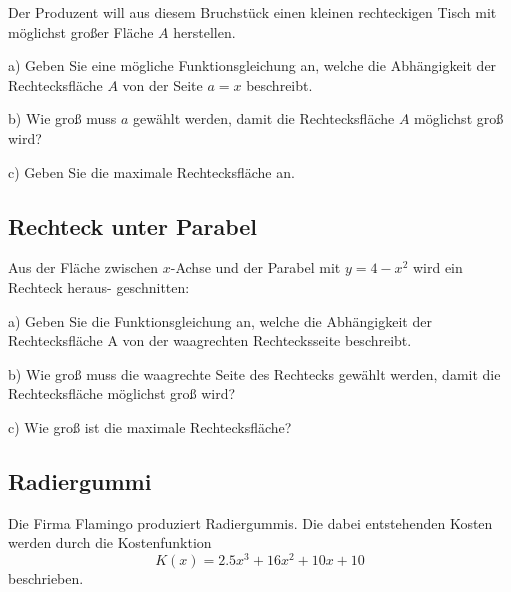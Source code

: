 Der Produzent will aus diesem Bruchstück einen kleinen rechteckigen Tisch mit möglichst großer
Fläche $A$ herstellen.


a)
Geben Sie eine mögliche Funktionsgleichung an, welche die Abhängigkeit
der Rechtecksfläche $A$ von der Seite $a=x$ beschreibt.

b) Wie groß muss $a$ gewählt werden, damit die Rechtecksfläche $A$
möglichst groß wird?

c) Geben Sie die maximale Rechtecksfläche an.


\subsection{Rechteck unter Parabel}

Aus der Fläche zwischen $x$-Achse und der
Parabel mit $y=4-x^2$ wird ein Rechteck heraus-
geschnitten:

a) 
Geben Sie die Funktionsgleichung an,
welche die Abhängigkeit der Rechtecksfläche A von der waagrechten
Rechtecksseite beschreibt.

b) 
Wie groß muss die waagrechte Seite des
Rechtecks gewählt werden, damit die
Rechtecksfläche möglichst groß wird?

c)
Wie groß ist die maximale Rechtecksfläche?

\subsection{Radiergummi}
Die Firma Flamingo produziert Radiergummis. Die dabei entstehenden
Kosten werden durch die Kostenfunktion
$$K(x) = 2.5x^3 + 16x^2 + 10x + 10$$
beschrieben.

